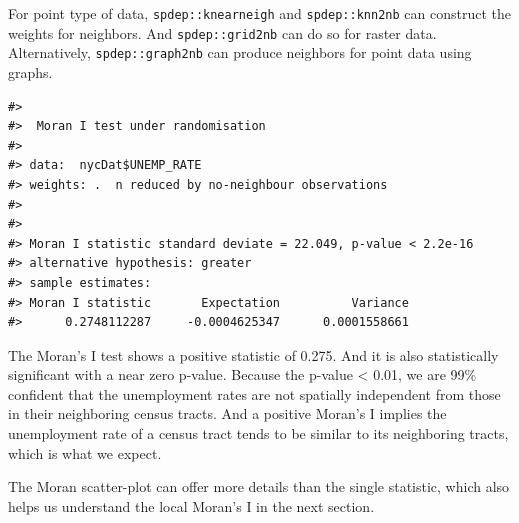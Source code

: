\documentclass[
  11pt,
]{book}
\newenvironment{Shaded}{\begin{snugshade}}{\end{snugshade}}
\newcommand{\AttributeTok}[1]{\textcolor[rgb]{0.77,0.63,0.00}{#1}}
\newcommand{\CommentTok}[1]{\textcolor[rgb]{0.56,0.35,0.01}{\textit{#1}}}
\newcommand{\ConstantTok}[1]{\textcolor[rgb]{0.00,0.00,0.00}{#1}}
\newcommand{\FunctionTok}[1]{\textcolor[rgb]{0.00,0.00,0.00}{#1}}
\newcommand{\NormalTok}[1]{#1}
\newcommand{\OtherTok}[1]{\textcolor[rgb]{0.56,0.35,0.01}{#1}}
\newcommand{\SpecialCharTok}[1]{\textcolor[rgb]{0.00,0.00,0.00}{#1}}
\newcommand{\StringTok}[1]{\textcolor[rgb]{0.31,0.60,0.02}{#1}}
\begin{document}
For point type of data, \texttt{spdep::knearneigh} and \texttt{spdep::knn2nb} can construct the weights for neighbors. And \texttt{spdep::grid2nb} can do so for raster data. Alternatively, \texttt{spdep::graph2nb} can produce neighbors for point data using graphs.

\begin{Shaded}
\end{Shaded}

\begin{verbatim}
#> 
#>  Moran I test under randomisation
#> 
#> data:  nycDat$UNEMP_RATE  
#> weights: .  n reduced by no-neighbour observations
#>   
#> 
#> Moran I statistic standard deviate = 22.049, p-value < 2.2e-16
#> alternative hypothesis: greater
#> sample estimates:
#> Moran I statistic       Expectation          Variance 
#>      0.2748112287     -0.0004625347      0.0001558661
\end{verbatim}

The Moran's I test shows a positive statistic of 0.275. And it is also statistically significant with a near zero p-value. Because the p-value \textless{} 0.01, we are 99\% confident that the unemployment rates are not spatially independent from those in their neighboring census tracts. And a positive Moran's I implies the unemployment rate of a census tract tends to be similar to its neighboring tracts, which is what we expect.

The Moran scatter-plot can offer more details than the single statistic, which also helps us understand the local Moran's I in the next section.
\end{document}
